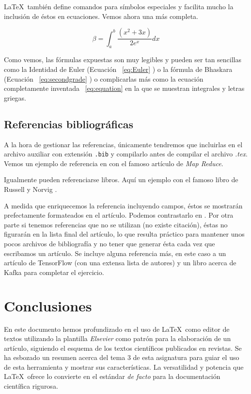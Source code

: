 \documentclass[review]{elsarticle}
\begin{document}
\LaTeX\ también define comandos para símbolos especiales y facilita mucho la inclusión de éstos en ecuaciones. Vemos ahora una más completa.


\begin{equation} \label{eq:equation} 
  \beta = \int_{a}^{b}{\frac{(x^2 + 3x)}{2e^x}dx}
\end{equation}

Como vemos, las fórmulas expuestas son muy legibles y pueden ser tan sencillas como la Identidad de Euler (Ecuación ~\ref{eq:Euler} ) o la fórmula de Bhaskara (Ecuación ~\ref{eq:secondgrade} ) o complicarlas más como la ecuación completamente inventada ~\ref{eq:equation} en la que se muestran integrales y letras griegas. 


\subsection{Referencias bibliográficas}

A la hora de gestionar las referencias, únicamente tendremos que incluirlas en el archivo auxiliar con extensión \texttt{.bib} y compilarlo antes de compilar el archivo \textit{.tex}. Vemos un ejemplo de referencia en \cite{Dean:2004:MSD:1251254.1251264} con el famoso artículo de \textit{Map Reduce}.

Igualmente pueden referenciarse libros. Aquí un ejemplo con el famoso libro de Russell y Norvig \cite{Russell:2003:AIM:773294}.

A medida que enriquecemos la referencia incluyendo campos, éstos se mostrarán prefectamente formateados en el artículo. Podemos contrastarlo en \cite{Groman:1996:ESH:381984.381988}. Por otra parte si tenemos referencias que no se utilizan (no existe citación), éstas no figurarán en la lista final del artículo, lo que resulta práctico para mantener unos pocos archivos de bibliografía y no tener que generar ésta cada vez que escribamos un artículo. 
Se incluye alguna referencia más, en este caso a un artículo de TensorFlow \cite{tensorflow2015-whitepaper} (con una extensa lista de autores) y un libro acerca de Kafka \cite{Narkhede:2017:KDG:3175825} para completar el ejercicio.

\section{Conclusiones}

En este documento hemos profundizado en el uso de \LaTeX\ como editor de textos utilizando la plantilla \textit{Elsevier} como patrón para la elaboración de un artículo, siguiendo el esquema de los textos científicos publicados en revistas. Se ha esbozado un resumen acerca del tema 3 de esta asignatura para guiar el uso de esta herramienta y mostrar sus características.  La versatilidad y potencia que \LaTeX\ ofrece lo convierte en el estándar \textit{de facto} para la documentación científica rigurosa. 

\section*{}


\end{document}
